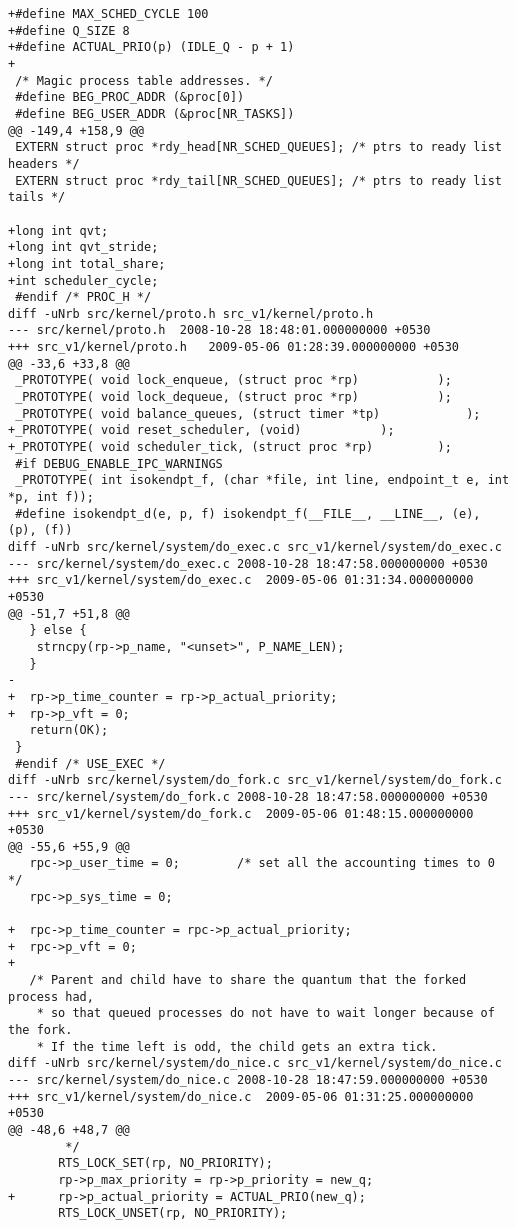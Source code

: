\begin{verbatim}
+#define MAX_SCHED_CYCLE 100
+#define Q_SIZE 8
+#define ACTUAL_PRIO(p) (IDLE_Q - p + 1)
+
 /* Magic process table addresses. */
 #define BEG_PROC_ADDR (&proc[0])
 #define BEG_USER_ADDR (&proc[NR_TASKS])
@@ -149,4 +158,9 @@
 EXTERN struct proc *rdy_head[NR_SCHED_QUEUES]; /* ptrs to ready list headers */
 EXTERN struct proc *rdy_tail[NR_SCHED_QUEUES]; /* ptrs to ready list tails */
 
+long int qvt;
+long int qvt_stride;
+long int total_share;
+int scheduler_cycle;
 #endif /* PROC_H */
diff -uNrb src/kernel/proto.h src_v1/kernel/proto.h
--- src/kernel/proto.h	2008-10-28 18:48:01.000000000 +0530
+++ src_v1/kernel/proto.h	2009-05-06 01:28:39.000000000 +0530
@@ -33,6 +33,8 @@
 _PROTOTYPE( void lock_enqueue, (struct proc *rp)			);
 _PROTOTYPE( void lock_dequeue, (struct proc *rp)			);
 _PROTOTYPE( void balance_queues, (struct timer *tp)			);
+_PROTOTYPE( void reset_scheduler, (void)			);
+_PROTOTYPE( void scheduler_tick, (struct proc *rp)			);
 #if DEBUG_ENABLE_IPC_WARNINGS
 _PROTOTYPE( int isokendpt_f, (char *file, int line, endpoint_t e, int *p, int f));
 #define isokendpt_d(e, p, f) isokendpt_f(__FILE__, __LINE__, (e), (p), (f))
diff -uNrb src/kernel/system/do_exec.c src_v1/kernel/system/do_exec.c
--- src/kernel/system/do_exec.c	2008-10-28 18:47:58.000000000 +0530
+++ src_v1/kernel/system/do_exec.c	2009-05-06 01:31:34.000000000 +0530
@@ -51,7 +51,8 @@
   } else {
   	strncpy(rp->p_name, "<unset>", P_NAME_LEN);
   }
-  
+  rp->p_time_counter = rp->p_actual_priority;
+  rp->p_vft = 0;
   return(OK);
 }
 #endif /* USE_EXEC */
diff -uNrb src/kernel/system/do_fork.c src_v1/kernel/system/do_fork.c
--- src/kernel/system/do_fork.c	2008-10-28 18:47:58.000000000 +0530
+++ src_v1/kernel/system/do_fork.c	2009-05-06 01:48:15.000000000 +0530
@@ -55,6 +55,9 @@
   rpc->p_user_time = 0;		/* set all the accounting times to 0 */
   rpc->p_sys_time = 0;
 
+  rpc->p_time_counter = rpc->p_actual_priority;
+  rpc->p_vft = 0;
+
   /* Parent and child have to share the quantum that the forked process had,
    * so that queued processes do not have to wait longer because of the fork.
    * If the time left is odd, the child gets an extra tick.
diff -uNrb src/kernel/system/do_nice.c src_v1/kernel/system/do_nice.c
--- src/kernel/system/do_nice.c	2008-10-28 18:47:59.000000000 +0530
+++ src_v1/kernel/system/do_nice.c	2009-05-06 01:31:25.000000000 +0530
@@ -48,6 +48,7 @@
        */
       RTS_LOCK_SET(rp, NO_PRIORITY);
       rp->p_max_priority = rp->p_priority = new_q;
+      rp->p_actual_priority = ACTUAL_PRIO(new_q);
       RTS_LOCK_UNSET(rp, NO_PRIORITY);
 

\end{verbatim}
